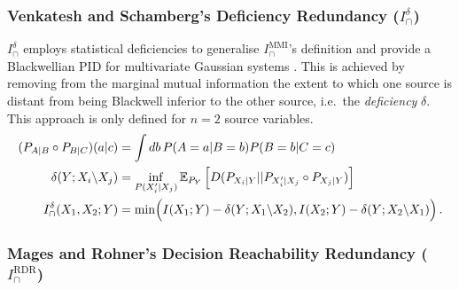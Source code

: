 \documentclass{article}
\newcommand{\IMMI}{\ensuremath{I_\cap^{\text{MMI}}}\xspace}
\newcommand{\Idelta}{\ensuremath{I_\cap^{\delta}}\xspace}
\newcommand{\IRDR}{\ensuremath{I_\cap^{\text{RDR}}}\xspace}
\begin{document}
\subsubsection*{Venkatesh and Schamberg's Deficiency Redundancy ($\Idelta$)}

$\Idelta$ employs statistical deficiencies to generalise $\IMMI$'s definition and provide a Blackwellian PID for multivariate Gaussian systems \cite{venkatesh2022partial}. This is achieved by removing from the marginal mutual information the extent to which one source is distant from being Blackwell inferior to the other source, i.e.\ the \textit{deficiency} $\delta$. This approach is only defined for $n=2$ source variables.  
\begin{align}
    (P_{A|B}\circ P_{B|C})(a|c) & = \int db \, P(A=a|B=b)P(B=b|C=c) \\  
    \delta(Y;X_i\backslash X_j) & = \inf_{P(X_i'|X_j)} \mathbb{E}_{P_Y}\left[D(P_{X_i|Y}||P_{X_i'|X_j}\circ P_{X_j|Y})\right] \\
    I_\cap^\delta(X_1,X_2;Y) & = \min \Bigl(I(X_1;Y)-\delta(Y;X_1\backslash X_2), I(X_2;Y)-\delta(Y;X_2\backslash X_1)\Bigr)\,.
\end{align}

\subsubsection*{Mages and Rohner's Decision Reachability Redundancy ($\IRDR$)}
\end{document}
